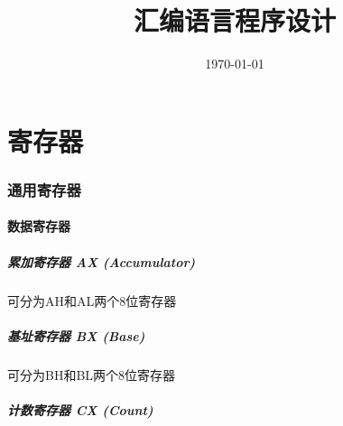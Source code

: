 \documentclass{article}
\title{汇编语言程序设计}
\author{}
\date{\today}
\begin{document}
\hypersetup{
    hidelinks,
    allcolors=black,
    breaklinks=true
}

\newtheorem{definition}{Definition}[subsection]
\newtheorem{theorem}{Theorem}[subsection]
\newtheorem{corollary}{Corollary}[theorem]
\renewcommand{\proofname}{\indent\bf Proof}

\def\e{\mathrm e}
\def\i{\mathrm i}
\def\j{\mathrm j}
\def\d{\mathrm d}
\def\C{\mathrm C}
\def\sr{\mathbb R}
\def\sn{\mathbb N}
\def\snp{\mathbb N^+}
\def\sc{\mathbb C}
\def\sz{\mathbb Z}
\def\impint{\int\limits_{-\infty}^{+\infty}}

\newcommand{\abs}[1]{\left|#1\right|}
\newcommand{\pare}[1]{\left(#1\right)}

\begin{titlepage}
    \maketitle
\end{titlepage}

\tableofcontents
\newpage

\part{寄存器}

\section{通用寄存器}

\subsection{数据寄存器}

\subsubsection{累加寄存器 AX (Accumulator)}

可分为AH和AL两个8位寄存器

\subsubsection{基址寄存器 BX (Base)}

可分为BH和BL两个8位寄存器


\subsubsection{计数寄存器 CX (Count)}
\end{document}
